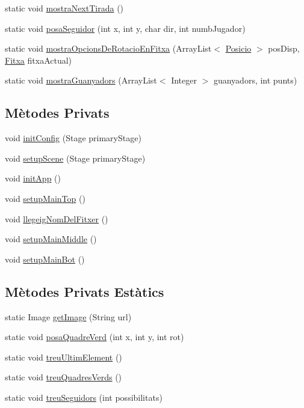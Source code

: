 \begin{DoxyCompactItemize}
static void \mbox{\hyperlink{class_gui_a57472094cd3fe87243415881b6a2f928}{mostra\+Next\+Tirada}} ()
\item 
static void \mbox{\hyperlink{class_gui_abc7c9d2b0581636190ecc53bfc4b29fb}{posa\+Seguidor}} (int x, int y, char dir, int numb\+Jugador)
\item 
static void \mbox{\hyperlink{class_gui_a14de8e45496b14e62ca59676d0aae3fe}{mostra\+Opcions\+De\+Rotacio\+En\+Fitxa}} (Array\+List$<$ \mbox{\hyperlink{class_posicio}{Posicio}} $>$ pos\+Disp, \mbox{\hyperlink{class_fitxa}{Fitxa}} fitxa\+Actual)
\item 
static void \mbox{\hyperlink{class_gui_a561f8d0d185d5dcb133ea83385380d6c}{mostra\+Guanyadors}} (Array\+List$<$ Integer $>$ guanyadors, int punts)
\end{DoxyCompactItemize}
\subsection*{Mètodes Privats}
\begin{DoxyCompactItemize}
\item 
void \mbox{\hyperlink{class_gui_ad63939d05f3eea6931bcc16234afe330}{init\+Config}} (Stage primary\+Stage)
\item 
void \mbox{\hyperlink{class_gui_a5d68899327d6f647d058ccc57b78634d}{setup\+Scene}} (Stage primary\+Stage)
\item 
void \mbox{\hyperlink{class_gui_a419d7993c3c961fd4e102ec5644b5bd6}{init\+App}} ()
\item 
void \mbox{\hyperlink{class_gui_a9213a84890405b2cd77441b7f0654318}{setup\+Main\+Top}} ()
\item 
void \mbox{\hyperlink{class_gui_a6bc8d9bda8f813b8d6c303ae798646b5}{llegeig\+Nom\+Del\+Fitxer}} ()
\item 
void \mbox{\hyperlink{class_gui_a0487820e6936c7fe1f38acf0d0ad1d8a}{setup\+Main\+Middle}} ()
\item 
void \mbox{\hyperlink{class_gui_a53da74ae8290c1e419b6e5e4994acf0a}{setup\+Main\+Bot}} ()
\end{DoxyCompactItemize}
\subsection*{Mètodes Privats Estàtics}
\begin{DoxyCompactItemize}
\item 
static Image \mbox{\hyperlink{class_gui_a08cce94ed9a31122dadba010c4ebcb1c}{get\+Image}} (String url)
\item 
static void \mbox{\hyperlink{class_gui_ac731f68776f8bdaf1637d5a448be4b48}{posa\+Quadre\+Verd}} (int x, int y, int rot)
\item 
static void \mbox{\hyperlink{class_gui_af97132d72a7474397afb22594b0119c5}{treu\+Ultim\+Element}} ()
\item 
static void \mbox{\hyperlink{class_gui_a6364d40f472084c5d50859159b8c46d4}{treu\+Quadres\+Verds}} ()
\item 
static void \mbox{\hyperlink{class_gui_a3887b907e40f86fddd2ff2f182342b7c}{treu\+Seguidors}} (int possibilitats)
\end{DoxyCompactItemize}
